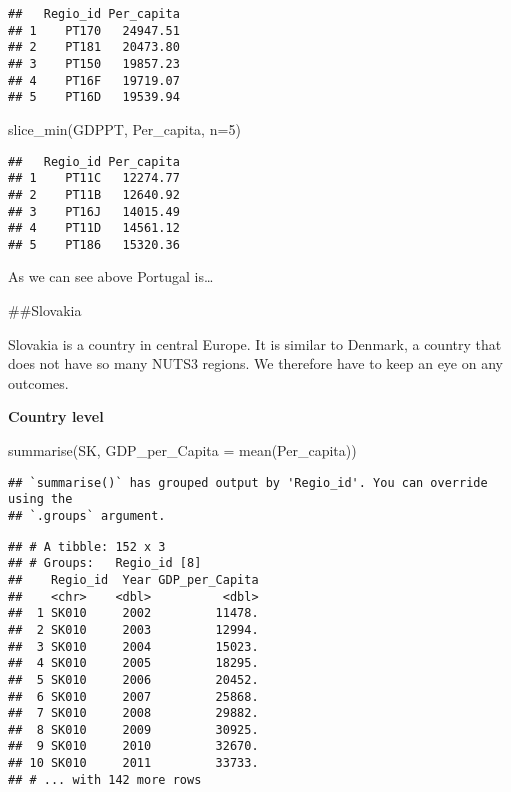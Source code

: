 \documentclass[
]{article}
\newenvironment{Shaded}{\begin{snugshade}}{\end{snugshade}}
\newcommand{\AttributeTok}[1]{\textcolor[rgb]{0.77,0.63,0.00}{#1}}
\newcommand{\DecValTok}[1]{\textcolor[rgb]{0.00,0.00,0.81}{#1}}
\newcommand{\FunctionTok}[1]{\textcolor[rgb]{0.00,0.00,0.00}{#1}}
\newcommand{\NormalTok}[1]{#1}
\begin{document}
\begin{verbatim}
##   Regio_id Per_capita
## 1    PT170   24947.51
## 2    PT181   20473.80
## 3    PT150   19857.23
## 4    PT16F   19719.07
## 5    PT16D   19539.94
\end{verbatim}

\begin{Shaded}
\begin{Highlighting}[]
\FunctionTok{slice\_min}\NormalTok{(GDPPT, Per\_capita, }\AttributeTok{n=}\DecValTok{5}\NormalTok{)}
\end{Highlighting}
\end{Shaded}

\begin{verbatim}
##   Regio_id Per_capita
## 1    PT11C   12274.77
## 2    PT11B   12640.92
## 3    PT16J   14015.49
## 4    PT11D   14561.12
## 5    PT186   15320.36
\end{verbatim}

As we can see above Portugal is\ldots{}

\#\#Slovakia

Slovakia is a country in central Europe. It is similar to Denmark, a
country that does not have so many NUTS3 regions. We therefore have to
keep an eye on any outcomes.

\textbf{Country level}

\begin{Shaded}
\begin{Highlighting}[]
    \FunctionTok{summarise}\NormalTok{(SK, }\AttributeTok{GDP\_per\_Capita =} \FunctionTok{mean}\NormalTok{(Per\_capita))}
\end{Highlighting}
\end{Shaded}

\begin{verbatim}
## `summarise()` has grouped output by 'Regio_id'. You can override using the
## `.groups` argument.
\end{verbatim}

\begin{verbatim}
## # A tibble: 152 x 3
## # Groups:   Regio_id [8]
##    Regio_id  Year GDP_per_Capita
##    <chr>    <dbl>          <dbl>
##  1 SK010     2002         11478.
##  2 SK010     2003         12994.
##  3 SK010     2004         15023.
##  4 SK010     2005         18295.
##  5 SK010     2006         20452.
##  6 SK010     2007         25868.
##  7 SK010     2008         29882.
##  8 SK010     2009         30925.
##  9 SK010     2010         32670.
## 10 SK010     2011         33733.
## # ... with 142 more rows
\end{verbatim}
\end{document}
